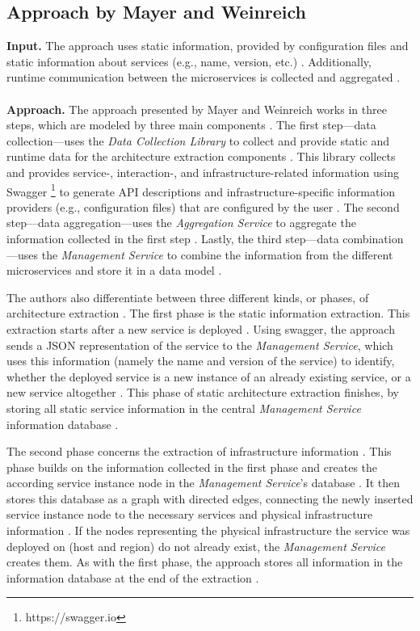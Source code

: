 \subsection{Approach by Mayer and Weinreich}
\label{sec:Results:Mayer}
\textbf{Input.}
The approach uses static information, provided by configuration files and static information about services (e.g., name, version, etc.) \cite{Mayer2018}.
Additionally, runtime communication between the microservices is collected and aggregated \cite{Mayer2018}.
\\ \\
\textbf{Approach.}
The approach presented by Mayer and Weinreich works in three steps, which are modeled by three main components \cite{Mayer2018}.
The first step---data collection---uses the \textit{Data Collection Library} to collect and provide static and runtime data for the architecture extraction components \cite{Mayer2018}.
This library collects and provides service-, interaction-, and infrastructure-related information using Swagger \footnote{https://swagger.io} to generate API descriptions and infrastructure-specific information providers (e.g., configuration files) that are configured by the user \cite{Mayer2018}.
The second step---data aggregation---uses the \textit{Aggregation Service} to aggregate the information collected in the first step \cite{Mayer2018}.
Lastly, the third step---data combination---uses the \textit{Management Service} to combine the information from the different microservices and store it in a data model \cite{Mayer2018}.

The authors also differentiate between three different kinds, or phases, of architecture extraction \cite{Mayer2018}.
The first phase is the static information extraction.
This extraction starts after a new service is deployed \cite{Mayer2018}.
Using swagger, the approach sends a JSON representation of the service to the \textit{Management Service}, which uses this information (namely the name and version of the service) to identify, whether the deployed service is a new instance of an already existing service, or a new service altogether \cite{Mayer2018}.
This phase of static architecture extraction finishes, by storing all static service information in the central \textit{Management Service} information database \cite{Mayer2018}.

The second phase concerns the extraction of infrastructure information \cite{Mayer2018}.
This phase builds on the information collected in the first phase and creates the according service instance node in the \textit{Management Service}'s database \cite{Mayer2018}.
It then stores this database as a graph with directed edges, connecting the newly inserted service instance node to the necessary services and physical infrastructure information \cite{Mayer2018}.
If the nodes representing the physical infrastructure the service was deployed on (host and region) do not already exist, the \textit{Management Service} creates them.
As with the first phase, the approach stores all information in the information database at the end of the extraction \cite{Mayer2018}.

